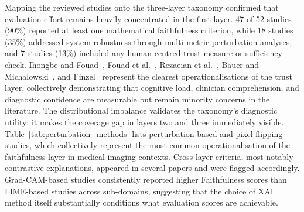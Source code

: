 Mapping the reviewed studies onto the three-layer taxonomy confirmed that
evaluation effort remains heavily concentrated in the first layer.
47 of 52 studies (90\%) reported at least one mathematical faithfulness
criterion, while 18 studies (35\%) addressed system robustness through
multi-metric perturbation analyses, and 7 studies (13\%) included any
human-centred trust measure or sufficiency check. Ihongbe and
Fouad~\cite{IhongbeFouad2024}, Fouad et al.~\cite{11355720},
Rezaeian et al.~\cite{rezaeian2026explainability}, Bauer and
Michalowski~\cite{bauer2025human}, and Finzel~\cite{finzel2024human}
represent the clearest operationalisations of the trust layer, collectively
demonstrating that cognitive load, clinician comprehension, and diagnostic
confidence are measurable but remain minority concerns in the literature.
The distributional imbalance validates the taxonomy's diagnostic utility:
it makes the coverage gap in layers two and three immediately visible.
Table~\ref{tab:perturbation_methods}
lists perturbation-based and pixel-flipping studies, which collectively
represent the most common operationalisation of the faithfulness layer in
medical imaging contexts. Cross-layer criteria, most notably contrastive
explanations, appeared in several papers and were flagged accordingly.
Grad-CAM-based studies consistently reported higher Faithfulness scores than
LIME-based studies across sub-domains, suggesting that the choice of XAI
method itself substantially conditions what evaluation scores are achievable.




